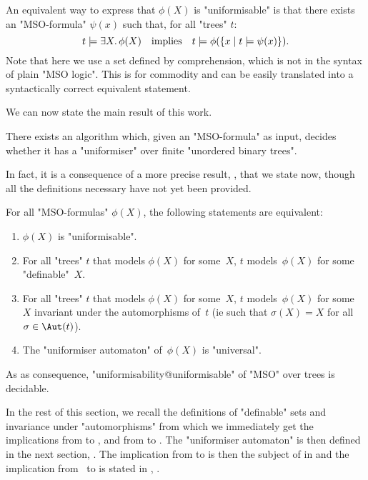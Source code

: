 \documentclass[a4paper,UKenglish,cleveref, autoref, thm-restate]{lipics-v2021}
\begin{document}
\begin{remark}\label{remark:uniformisability}
	An equivalent way to express that $\phi(X)$ is "uniformisable" is that there exists an "MSO-formula" $\psi(x)$ such that, for all "trees" $t$:
	\[
		t \models \exists X.\, \phi(X) \quad \text{implies} \quad t \models \phi(\left\{x \mid t \models \psi(x)\right\}).
	\]
	Note that here we use a set defined by comprehension, which is not in the syntax of plain "MSO logic".
	This is for commodity and can be easily translated into a syntactically correct equivalent statement.
\end{remark}

We can now state the main result of this work.
\begin{theorem} \label{thm:uniformisability-decision}\label{theorem:main}
	There exists an algorithm which, given an "MSO-formula" as input, decides whether it has a "uniformiser" over finite "unordered binary trees".
\end{theorem}

In fact, it is a consequence of a more precise result, , that we state now, though all the definitions necessary have not yet been provided.
\begin{lemma}\label{lem:main-result}\label{lemma:main}
	For all "MSO-formulas" $\phi(X)$, the following statements are equivalent:
	\begin{enumerate}
		\item $\phi(X)$ is "uniformisable". \label{lem:main-result-1}
		\item For all "trees" $t$ that models $\phi(X)$ for some~$X$, $t$ models~$\phi(X)$ for some "definable"~$X$. \label{lem:main-result-2}
		\item For all "trees" $t$ that models $\phi(X)$ for some~$X$, $t$ models~$\phi(X)$ for some~$X$ invariant under the automorphisms of~$t$ (ie such that $\sigma(X) = X$ for all $\sigma \in \Aut(t)$). \label{lem:main-result-3}
		\item The "uniformiser automaton" of~$\phi(X)$ is "universal". \label{lem:main-result-4}
	\end{enumerate}
	As as consequence, "uniformisability@uniformisable" of "MSO" over trees is decidable.
\end{lemma}

In the rest of this section, we recall the definitions of "definable" sets and invariance under "automorphisms" from which we immediately get the implications from
 to , and from  to . The "uniformiser automaton"
is then defined in the next section, . The implication from  to  is then the subject of
 in  and the implication from~ to  is stated in
, .
\end{document}
